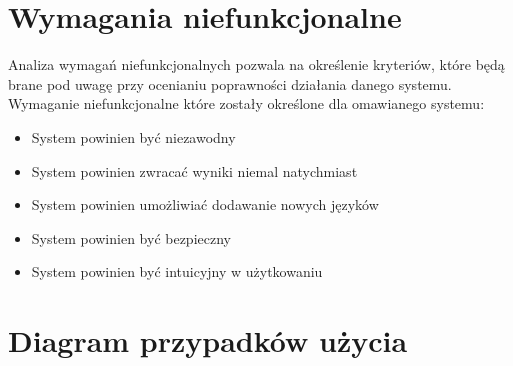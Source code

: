 \section{Wymagania niefunkcjonalne}
\label{sec:wymaganiaNiefunkcjonalne}
Analiza wymagań niefunkcjonalnych pozwala na określenie kryteriów, które będą brane pod uwagę przy ocenianiu poprawności działania danego systemu. \\
Wymaganie niefunkcjonalne które zostały określone dla omawianego systemu:
\begin{itemize}
\item System powinien być niezawodny
\item System powinien zwracać wyniki niemal natychmiast
\item System powinien umożliwiać dodawanie nowych języków
\item System powinien być bezpieczny
\item System powinien być intuicyjny w użytkowaniu
\end{itemize}

\section{Diagram przypadków użycia}
\label{sec:przypadkiUzycia}
\noindent
\begin{minipage}{\linewidth}
\label{use-case}
\end{minipage}

